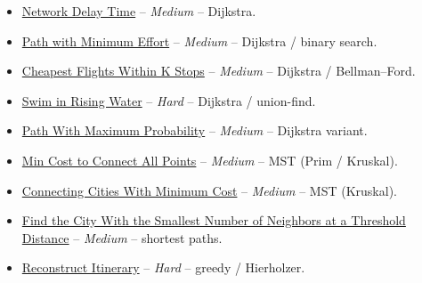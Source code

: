 \documentclass[11pt]{article}
\begin{document}
\begin{itemize}
  \item \href{https://leetcode.com/problems/network-delay-time/}{Network Delay Time} -- \emph{Medium} -- Dijkstra.
  \item \href{https://leetcode.com/problems/path-with-minimum-effort/}{Path with Minimum Effort} -- \emph{Medium} -- Dijkstra / binary search.
  \item \href{https://leetcode.com/problems/cheapest-flights-within-k-stops/}{Cheapest Flights Within K Stops} -- \emph{Medium} -- Dijkstra / Bellman--Ford.
  \item \href{https://leetcode.com/problems/swim-in-rising-water/}{Swim in Rising Water} -- \emph{Hard} -- Dijkstra / union-find.
  \item \href{https://leetcode.com/problems/path-with-maximum-probability/}{Path With Maximum Probability} -- \emph{Medium} -- Dijkstra variant.
  \item \href{https://leetcode.com/problems/min-cost-to-connect-all-points/}{Min Cost to Connect All Points} -- \emph{Medium} -- MST (Prim / Kruskal).
  \item \href{https://leetcode.com/problems/connecting-cities-with-minimum-cost/}{Connecting Cities With Minimum Cost} -- \emph{Medium} -- MST (Kruskal).
  \item \href{https://leetcode.com/problems/find-the-city-with-the-smallest-number-of-neighbors-at-a-threshold-distance/}{Find the City With the Smallest Number of Neighbors at a Threshold Distance} -- \emph{Medium} -- shortest paths.
  \item \href{https://leetcode.com/problems/reconstruct-itinerary/}{Reconstruct Itinerary} -- \emph{Hard} -- greedy / Hierholzer.
\end{itemize}
\end{document}
